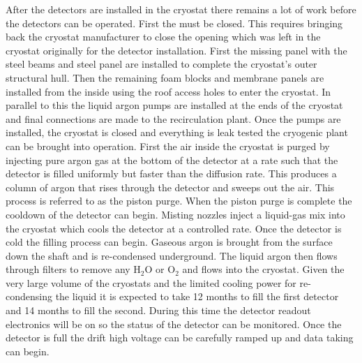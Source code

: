 After the detectors are installed in the cryostat there remains a lot
of work before the detectors can be operated. First the 
must be closed. This requires bringing back the cryostat manufacturer
to close the opening which was left in the cryostat originally for the
detector installation. First the missing panel with the steel beams
and steel panel are installed to complete the cryostat's outer
structural hull. Then the remaining foam blocks and membrane panels
are installed from the inside using the roof access holes to enter the
cryostat. In parallel to this the liquid argon pumps are installed at
the ends of the cryostat and final connections are made to the
recirculation plant. Once the pumps are installed, the cryostat is
closed and everything is leak tested the cryogenic plant can be
brought into operation. First the air inside the cryostat is purged by
injecting pure argon gas at the bottom of the detector at a rate such
that the detector is filled uniformly but faster than the diffusion
rate. This produces a column of argon that rises through the detector
and sweeps out the air. This process is referred to as the piston
purge. When the piston purge is complete the cooldown of the detector
can begin. Misting nozzles inject a liquid-gas mix into the cryostat
which cools the detector at a controlled rate. Once the detector is
cold the filling process can begin. Gaseous argon is brought from the
surface down the shaft and is re-condensed underground. The liquid
argon then flows through filters to remove any H$_2$O or O$_2$ and
flows into the cryostat. Given the very large volume of the cryostats
and the limited cooling power for re-condensing the liquid it is
expected to take 12 months to fill the first detector and 14 months to
fill the second. During this time the detector readout electronics
will be on so the status of the detector can be monitored. Once the
detector is full the drift high voltage can be carefully ramped up and
data taking can begin.


